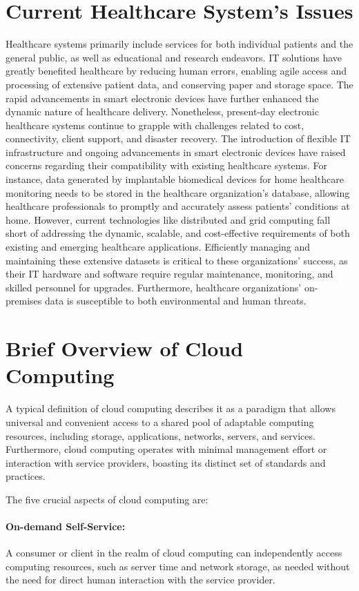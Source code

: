 \documentclass{article}
\begin{document}
\section{Current Healthcare System's Issues} Healthcare systems primarily include services for both individual patients and the general public, as well as educational and research endeavors. IT solutions have greatly benefited healthcare by reducing human errors, enabling agile access and processing of extensive patient data, and conserving paper and storage space. The rapid advancements in smart electronic devices have further enhanced the dynamic nature of healthcare delivery.
Nonetheless, present-day electronic healthcare systems continue to grapple with challenges related to cost, connectivity, client support, and disaster recovery. The introduction of flexible IT infrastructure and ongoing advancements in smart electronic devices have raised concerns regarding their compatibility with existing healthcare systems.
For instance, data generated by implantable biomedical devices for home healthcare monitoring needs to be stored in the healthcare organization's database, allowing healthcare professionals to promptly and accurately assess patients' conditions at home. However, current technologies like distributed and grid computing fall short of addressing the dynamic, scalable, and cost-effective requirements of both existing and emerging healthcare applications.
Efficiently managing and maintaining these extensive datasets is critical to these organizations' success, as their IT hardware and software require regular maintenance, monitoring, and skilled personnel for upgrades. Furthermore, healthcare organizations' on-premises data is susceptible to both environmental and human threats.

\medskip

\section{Brief Overview of Cloud Computing}
A typical definition of cloud computing describes it as a paradigm that allows universal and convenient access to a shared pool of adaptable computing resources, including storage, applications, networks, servers, and services. Furthermore, cloud computing operates with minimal management effort or interaction with service providers, boasting its distinct set of standards and practices.

The five crucial aspects of cloud computing are:
\paragraph{On-demand Self-Service:} A consumer or client in the realm of cloud computing can independently access computing resources, such as server time and network storage, as needed without the need for direct human interaction with the service provider.
\end{document}
